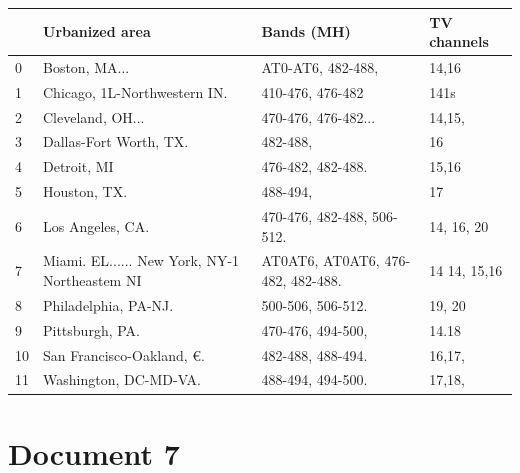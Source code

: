 \begin{tabular}{llll}
\toprule
{} &                                 Urbanized area &                         Bands (MH) &   TV channels \\
\midrule
0  &                                  Boston, MA... &                  AT0-AT6, 482-488, &         14,16 \\
1  &                   Chicago, 1L-Northwestern IN. &                   410-476, 476-482 &          141s \\
2  &                               Cleveland, OH... &                470-476, 476-482... &        14,15, \\
3  &                         Dallas-Fort Worth, TX. &                           482-488, &            16 \\
4  &                                    Detroit, MI &                  476-482, 482-488. &         15,16 \\
5  &                                   Houston, TX. &                           488-494, &            17 \\
6  &                               Los Angeles, CA. &         470-476, 482-488, 506-512. &    14, 16, 20 \\
7  &  Miami. EL...... New York, NY-1 Northeastem NI &  AT0AT6, AT0AT6, 476-482, 482-488. &  14 14, 15,16 \\
8  &                           Philadelphia, PA-NJ. &                  500-506, 506-512. &        19, 20 \\
9  &                                Pittsburgh, PA. &                  470-476, 494-500, &         14.18 \\
10 &                      San Francisco-Oakland, €. &                  482-488, 488-494. &        16,17, \\
11 &                          Washington, DC-MD-VA. &                  488-494, 494-500. &        17,18, \\
\bottomrule
\end{tabular}
\section{Document 7}

